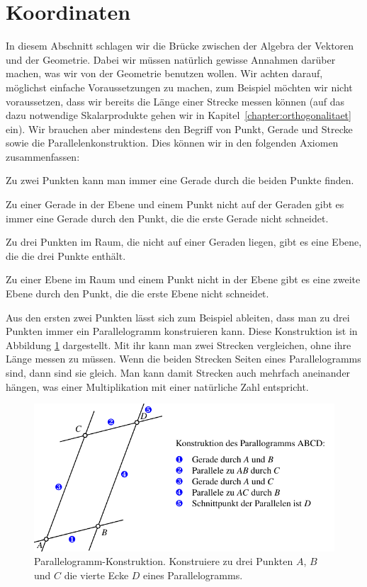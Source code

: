 %
%
%
\section{Koordinaten%
\label{skript:koordinaten}}
In diesem Abschnitt schlagen wir die Brücke zwischen der Algebra der
Vektoren und der Geometrie.
Dabei wir müssen natürlich gewisse Annahmen darüber machen, was
wir von der Geometrie benutzen wollen.
Wir achten darauf, möglichst einfache Voraussetzungen zu machen,
zum Beispiel möchten wir nicht voraussetzen, dass wir bereits
die Länge einer Strecke messen können (auf das dazu notwendige
Skalarprodukte gehen wir in Kapitel~\ref{chapter:orthogonalitaet} ein).
Wir brauchen aber mindestens den Begriff von Punkt, Gerade und Strecke
sowie die Parallelenkonstruktion.
Dies können wir in den folgenden Axiomen zusammenfassen:
\begin{compactenum}
\item
Zu zwei Punkten kann man immer eine Gerade durch die beiden Punkte
finden.
\item
Zu einer Gerade in der Ebene und einem Punkt nicht auf der Geraden
gibt es immer eine Gerade durch den Punkt, die die erste Gerade nicht
schneidet.
\item
Zu drei Punkten im Raum, die nicht auf einer Geraden liegen, gibt es
eine Ebene, die die drei Punkte enthält.
\item
Zu einer Ebene im Raum und einem Punkt nicht in der Ebene gibt es eine
zweite Ebene durch den Punkt, die die erste Ebene nicht schneidet.
\end{compactenum}
Aus den ersten zwei Punkten lässt sich zum Beispiel ableiten, dass
man zu drei Punkten immer ein Parallelogramm konstruieren kann.
Diese Konstruktion ist in Abbildung \ref{skript:affin:parallelogramm}
dargestellt.
Mit ihr kann man zwei Strecken vergleichen, ohne ihre Länge messen
zu müssen.
Wenn die beiden Strecken Seiten eines Parallelogramms sind, dann
sind sie gleich.
Man kann damit Strecken auch mehrfach aneinander hängen, was einer
Multiplikation mit einer natürliche Zahl entspricht.
\begin{figure}
\centering
\includegraphics{3/images/parallelogramm.pdf}
\caption{Parallelogramm-Konstruktion. Konstruiere zu drei Punkten
$A$, $B$ und $C$ die vierte Ecke $D$ eines Parallelogramms.
\label{skript:affin:parallelogramm}}
\end{figure}

